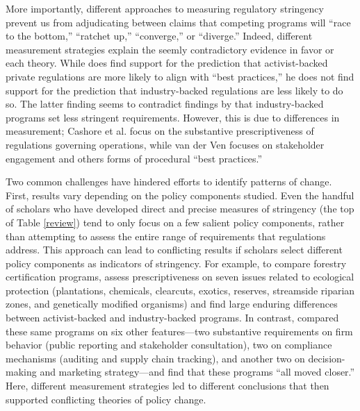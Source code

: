 \documentclass[
      12pt,
            Review ]{article}
\begin{document}
More importantly, different approaches to measuring regulatory
stringency prevent us from adjudicating between claims that competing
programs will ``race to the bottom,'' ``ratchet up,'' ``converge,'' or
``diverge.'' Indeed, different measurement strategies explain the seemly
contradictory evidence in favor or each theory. While
\citet{VanderVen2015} does find support for the prediction that
activist-backed private regulations are more likely to align with ``best
practices,'' he does not find support for the prediction that
industry-backed regulations are less likely to do so. The latter finding
seems to contradict findings by \citet{Cashore2004} that industry-backed
programs set less stringent requirements. However, this is due to
differences in measurement; Cashore et al. focus on the substantive
prescriptiveness of regulations governing operations, while van der Ven
focuses on stakeholder engagement and others forms of procedural ``best
practices.''

Two common challenges have hindered efforts to identify patterns of
change. First, results vary depending on the policy components studied.
Even the handful of scholars who have developed direct and precise
measures of stringency (the top of Table \ref{review}) tend to only
focus on a few salient policy components, rather than attempting to
assess the entire range of requirements that regulations address. This
approach can lead to conflicting results if scholars select different
policy components as indicators of stringency. For example, to compare
forestry certification programs, \citet{Cashore2004} assess
prescriptiveness on seven issues related to ecological protection
(plantations, chemicals, clearcuts, exotics, reserves, streamside
riparian zones, and genetically modified organisms) and find large
enduring differences between activist-backed and industry-backed
programs. In contrast, \citet{Overdevest2014} compared these same
programs on six other features---two substantive requirements on firm
behavior (public reporting and stakeholder consultation), two on
compliance mechanisms (auditing and supply chain tracking), and another
two on decision-making and marketing strategy---and find that these
programs ``all moved closer.'' Here, different measurement strategies
led to different conclusions that then supported conflicting theories of
policy change.
\end{document}
